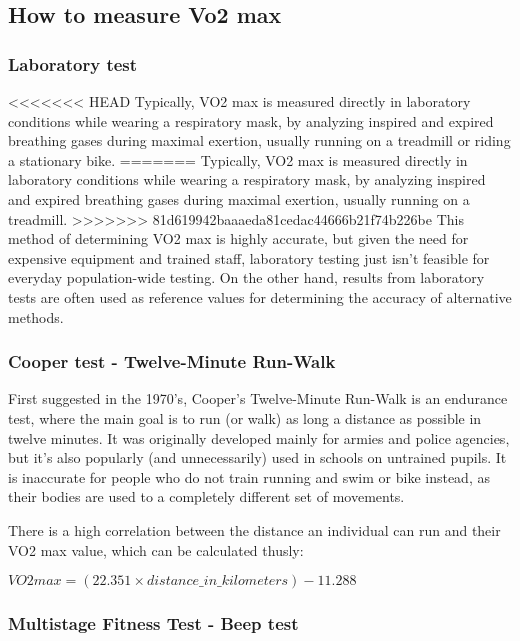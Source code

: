 \subsection{How to measure Vo2 max}

\subsubsection*{Laboratory test}

<<<<<<< HEAD
Typically, VO2 max is measured directly in laboratory conditions while wearing a respiratory mask, by analyzing inspired and expired breathing gases during maximal exertion,\cite{vo2max-definition} usually running on a treadmill or riding a stationary bike.
=======
Typically, VO2 max is measured directly in laboratory conditions while wearing a respiratory mask, by analyzing inspired and expired breathing gases during maximal exertion\cite{vo2max-definition}, usually running on a treadmill.
>>>>>>> 81d619942baaaeda81cedac44666b21f74b226be
This method of determining VO2 max is highly accurate, but given the need for expensive equipment and trained staff, laboratory testing just isn't feasible for everyday population-wide testing.
On the other hand, results from laboratory tests are often used as reference values for determining the accuracy of alternative methods.

\subsubsection*{Cooper test - Twelve-Minute Run-Walk}

First suggested in the 1970's, Cooper's Twelve-Minute Run-Walk is an endurance test, where the main goal is to run (or walk) as long a distance as possible in twelve minutes.
It was originally developed mainly for armies and police agencies, but it's also popularly (and unnecessarily\cite{cooper-pupils}) used in schools on untrained pupils.
It is inaccurate for people who do not train running and swim or bike instead, as their bodies are used to a completely different set of movements.

There is a high correlation between the distance an individual can run and their VO2 max value, which can be calculated thusly:

$VO2max = (22.351 \times distance\_in\_kilometers) - 11.288$\cite{cooper-vo2max}

\subsubsection*{Multistage Fitness Test - Beep test}

